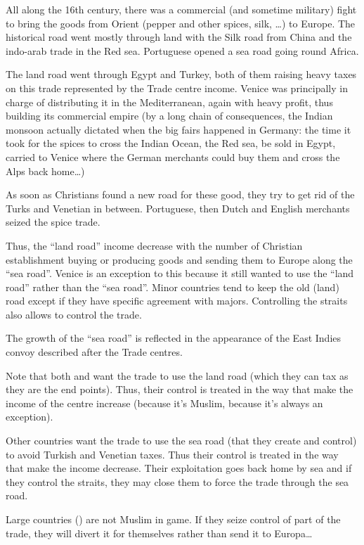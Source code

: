 \begin{histoire}
  All along the 16th century, there was a commercial (and sometime
  military) fight to bring the goods from Orient (pepper and other
  spices, silk, \ldots) to Europe. The historical road went mostly
  through land with the Silk road from China and the indo-arab trade in
  the Red sea. Portuguese opened a sea road going round Africa.

  The land road went through Egypt and Turkey, both of them raising
  heavy taxes on this trade represented by the Trade centre
  income. Venice was principally in charge of distributing it in the
  Mediterranean, again with heavy profit, thus building its commercial
  empire (by a long chain of consequences, the Indian monsoon actually
  dictated when the big fairs happened in Germany: the time it took
  for the spices to cross the Indian Ocean, the Red sea, be sold in
  Egypt, carried to Venice where the German merchants could buy them
  and cross the Alps back home\ldots)

  As soon as Christians found a new road for these good, they try to get
  rid of the Turks and Venetian in between. Portuguese, then Dutch and
  English merchants seized the spice trade.

  Thus, the ``land road'' income decrease with the number of Christian
  establishment buying or producing goods and sending them to Europe
  along the ``sea road''. Venice is an exception to this because it
  still wanted to use the ``land road'' rather than the ``sea
  road''. Minor countries tend to keep the old (land) road except if
  they have specific agreement with majors. Controlling the straits also
  allows to control the trade.

  The growth of the ``sea road'' is reflected in the appearance of the
  East Indies convoy described after the Trade centres.
\end{histoire}

\begin{designnote}
  Note that both \TUR and \VEN want the trade to use the land road
  (which they can tax as they are the end points). Thus, their control
  is treated in the way that make the income of the centre increase
  (\TUR because it's Muslim, \VEN because it's always an exception).

  Other countries want the trade to use the sea road (that they create
  and control) to avoid Turkish and Venetian taxes. Thus their control
  is treated in the way that make the income decrease. Their
  exploitation goes back home by sea and if they control the straits,
  they may close them to force the trade through the sea road.

  Large \ROTW countries (\paysMogols) are not Muslim in game. If they
  seize control of part of the trade, they will divert it for
  themselves rather than send it to Europa\ldots
\end{designnote}

